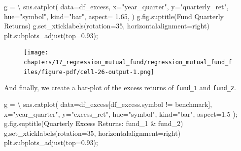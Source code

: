 \documentclass[
  letterpaper,
  DIV=11,
  numbers=noendperiod]{scrreprt}
\newenvironment{Shaded}{\begin{snugshade}}{\end{snugshade}}
\newcommand{\DecValTok}[1]{\textcolor[rgb]{0.68,0.00,0.00}{#1}}
\newcommand{\FloatTok}[1]{\textcolor[rgb]{0.68,0.00,0.00}{#1}}
\newcommand{\NormalTok}[1]{\textcolor[rgb]{0.00,0.23,0.31}{#1}}
\newcommand{\OperatorTok}[1]{\textcolor[rgb]{0.37,0.37,0.37}{#1}}
\newcommand{\StringTok}[1]{\textcolor[rgb]{0.13,0.47,0.30}{#1}}
\begin{document}
\begin{Shaded}
\begin{Highlighting}[]
\NormalTok{g }\OperatorTok{=} \OperatorTok{\textbackslash{}}
\NormalTok{    sns.catplot(}
\NormalTok{        data}\OperatorTok{=}\NormalTok{df\_excess, x}\OperatorTok{=}\StringTok{"year\_quarter"}\NormalTok{, y}\OperatorTok{=}\StringTok{"quarterly\_ret"}\NormalTok{,}
\NormalTok{        hue}\OperatorTok{=}\StringTok{"symbol"}\NormalTok{, kind}\OperatorTok{=}\StringTok{"bar"}\NormalTok{,}
\NormalTok{        aspect}\OperatorTok{=} \FloatTok{1.65}\NormalTok{, }
\NormalTok{    )}
\NormalTok{g.fig.suptitle(}\StringTok{\textquotesingle{}Fund Quarterly Returns\textquotesingle{}}\NormalTok{)}
\NormalTok{g.set\_xticklabels(rotation}\OperatorTok{=}\DecValTok{35}\NormalTok{, horizontalalignment}\OperatorTok{=}\StringTok{\textquotesingle{}right\textquotesingle{}}\NormalTok{)}
\NormalTok{plt.subplots\_adjust(top}\OperatorTok{=}\FloatTok{0.93}\NormalTok{)}\OperatorTok{;}
\end{Highlighting}
\end{Shaded}

\begin{figure}[H]

{\centering \texttt{[image: chapters/17\_regression\_mutual\_fund/regression\_mutual\_fund\_files/figure-pdf/cell-26-output-1.png]}

}

\end{figure}

And finally, we create a bar-plot of the excess returns of
\texttt{fund\_1} and \texttt{fund\_2}.

\begin{Shaded}
\begin{Highlighting}[]
\NormalTok{g }\OperatorTok{=} \OperatorTok{\textbackslash{}}
\NormalTok{    sns.catplot(}
\NormalTok{        data}\OperatorTok{=}\NormalTok{df\_excess[df\_excess.symbol }\OperatorTok{!=} \StringTok{\textquotesingle{}benchmark\textquotesingle{}}\NormalTok{],}
\NormalTok{        x}\OperatorTok{=}\StringTok{"year\_quarter"}\NormalTok{, y}\OperatorTok{=}\StringTok{"excess\_ret"}\NormalTok{, }
\NormalTok{        hue}\OperatorTok{=}\StringTok{"symbol"}\NormalTok{, kind}\OperatorTok{=}\StringTok{"bar"}\NormalTok{,}
\NormalTok{        aspect}\OperatorTok{=}\FloatTok{1.5}
\NormalTok{    )}\OperatorTok{;}
\NormalTok{g.fig.suptitle(}\StringTok{\textquotesingle{}Quarterly Excess Returns: fund\_1 \& fund\_2\textquotesingle{}}\NormalTok{)}
\NormalTok{g.set\_xticklabels(rotation}\OperatorTok{=}\DecValTok{35}\NormalTok{, horizontalalignment}\OperatorTok{=}\StringTok{\textquotesingle{}right\textquotesingle{}}\NormalTok{)}
\NormalTok{plt.subplots\_adjust(top}\OperatorTok{=}\FloatTok{0.93}\NormalTok{)}\OperatorTok{;}
\end{Highlighting}
\end{Shaded}
\end{document}
